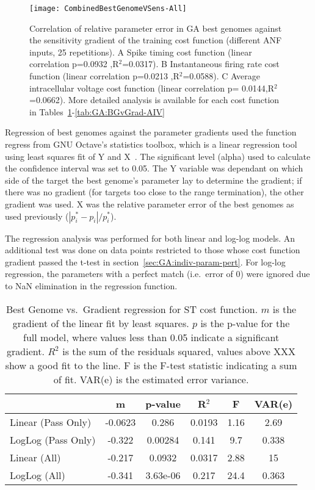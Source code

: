 \begin{figure}[th]
  \centering
  \texttt{[image: CombinedBestGenomeVSens-All]}  
  \caption{Correlation of relative parameter error in {GA} best genomes
    against the sensitivity gradient of the training cost function
    (different {ANF} inputs, 25 repetitions). A Spike timing cost
    function (linear correlation p=0.0932 ,R$^2$=0.0317). B
    Instantaneous firing rate cost function (linear correlation
    p=0.0213 ,R$^2$=0.0588).  C Average intracellular voltage cost
    function (linear correlation p= 0.0144,R$^2$=0.0662).  More
    detailed analysis is available for each cost function in
    Tables~\ref{tab:GA:BGvGrad-ST}-\ref{tab:GA:BGvGrad-AIV}}
  \label{fig:GA:BestGenomeVGradient}
\end{figure}
% 

Regression of best genomes against the parameter gradients used the
function \textsf{regress} from GNU Octave's \textsf{statistics}
toolbox, which is a linear regression tool using least squares fit of
Y and X~\citep{Eaton:2002}. The significant level (alpha) used to
calculate the confidence interval was set to 0.05. The Y variable was
dependant on which side of the target the best genome's parameter lay
to determine the gradient; if there was no gradient (for targets too
close to the range termination), the other gradient was used. X was
the relative parameter error of the best genomes as used previously
($\left|p^\ast_i-{p}_i\right|/p^\ast_i$).

\smallskip{}

The regression analysis was performed for both linear and log-log
models. An additional test was done on data points restricted to those
whose cost function gradient passed the t-test in
section~\ref{sec:GA:indiv-param-pert}. For log-log regression, the
parameters with a perfect match (i.e.\ error of 0) were ignored due to
NaN elimination in the regression function.

\smallskip{}

\begin{table}[th]
  \centering
  \begin{tabular}{lccccc}
\toprule
                   &    m    & p-value  & R$^2$ &  F  & VAR(e) \\[1ex] \midrule
Linear (Pass Only) & -0.0623 &  0.286   & 0.0193& 1.16& 2.69   \\
LogLog (Pass Only) & -0.322  & 0.00284  & 0.141 & 9.7 & 0.338 \\[0.5ex] \hline
   Linear (All)    & -0.217  &  0.0932  & 0.0317& 2.88& 15     \\
   LogLog (All)    & -0.341  & 3.63e-06 & 0.217 & 24.4& 0.363 \\[1ex] \hline    
 \end{tabular}
 \caption{Best Genome vs.\ Gradient regression for ST cost function. $m$ is the gradient of the linear fit by least squares. $p$ is the p-value for the full model, where values  less than 0.05 indicate a significant gradient. $R^2$ is the sum of the residuals  squared, values above XXX show a good fit to the line.  F is the F-test statistic  indicating a sum of fit. VAR(e) is the estimated error variance.  }
  \label{tab:GA:BGvGrad-ST}
\end{table}


